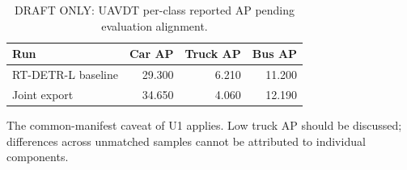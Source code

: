 \begin{table}[t]
\centering
\small
\setlength{\tabcolsep}{4pt}
\caption{DRAFT ONLY: UAVDT per-class reported AP pending evaluation alignment.}
\label{tab:selected-s3}
\begin{tabular}{lrrr}
\toprule
Run & Car AP & Truck AP & Bus AP \\
\midrule
RT-DETR-L baseline & 29.300 & 6.210 & 11.200 \\
Joint export & 34.650 & 4.060 & 12.190 \\
\bottomrule
\end{tabular}
\par\smallskip
\begin{minipage}{0.97\textwidth}\footnotesize The common-manifest caveat of U1 applies. Low truck AP should be discussed; differences across unmatched samples cannot be attributed to individual components.\end{minipage}
\par\medskip
\end{table}
